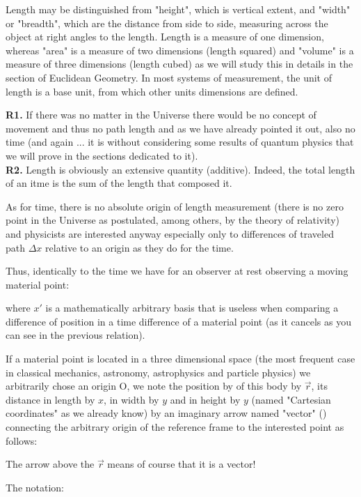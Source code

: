 	Length may be distinguished from "height", which is vertical extent, and "width" or "breadth", which are the distance from side to side, measuring across the object at right angles to the length. Length is a measure of one dimension, whereas "area" is a measure of two dimensions (length squared) and "volume" is a measure of three dimensions (length cubed) as we will study this in details in the section of Euclidean Geometry. In most systems of measurement, the unit of length is a base unit, from which other units dimensions are defined.
	\begin{tcolorbox}[title=Remarks,colframe=black,arc=10pt]
	\textbf{R1.} If there was no matter in the Universe there would be no concept of movement and thus no path length and as we have already pointed it out, also no time (and again ... it is without considering some results of quantum physics that we will prove in the sections dedicated to it).\\
	
	\textbf{R2.} Length is obviously an extensive quantity (additive). Indeed, the total length of an itme is the sum of the length that composed it.
	\end{tcolorbox}
	As for time, there is no absolute origin of length measurement (there is no zero point in the Universe as postulated, among others, by the theory of relativity) and physicists are interested anyway especially only to differences of traveled path $\Delta x$ relative to an origin as they do for the time.
	
	Thus, identically to the time we have for an observer at rest observing a moving material point:
	
	where $x'$ is a mathematically arbitrary basis that is useless when comparing a difference of position in a time difference of a material point (as it cancels as you can see in the previous relation).
	
	If a material point is located in a three dimensional space (the most frequent case in classical mechanics, astronomy, astrophysics and particle physics) we arbitrarily chose an origin O, we note the position by of this body by $\vec{r}$, its distance in length by $x$, in width by $y$ and in height by $y$ (named "Cartesian coordinates" as we already know) by an imaginary arrow named "vector" () connecting the arbitrary origin of the reference frame to the interested point as follows:
	
	\begin{tcolorbox}[title=Remark,colframe=black,arc=10pt]
	The arrow above the $\vec{r}$ means of course that it is a vector!
	\end{tcolorbox}
	The notation:
	
